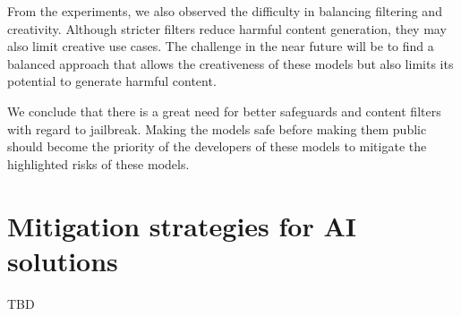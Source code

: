 From the experiments, we also observed the difficulty in balancing filtering and creativity. Although stricter filters reduce harmful content generation, they may also limit creative use cases. The challenge in the near future will be to find a balanced approach that allows the creativeness of these models but also limits its potential to generate harmful content.

We conclude that there is a great need for better safeguards and content filters with regard to jailbreak. Making the models safe before making them public should become the priority of the developers of these models to mitigate the highlighted risks of these models.

\section{Mitigation strategies for AI solutions}
TBD




